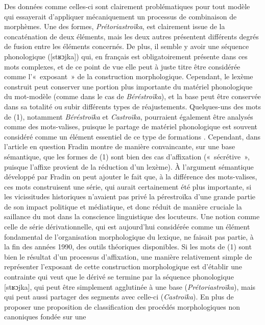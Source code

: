 \documentclass[output=paper]{langsci/langscibook}
\begin{document}
\largerpage[2]
Des données comme celles-ci sont clairement problématiques pour tout
modèle qui essayerait d'appliquer mécaniquement un processus de
combinaison de morphèmes. Une des formes, \emph{Prétoriastroïka}, est
clairement issue de la concaténation de deux éléments, mais les deux
autres présentent différents degrés de fusion entre les éléments
concernés. De plus, il semble y avoir une séquence phonologique
({[}stʁɔjka{]}) qui, en français est obligatoirement présente dans ces
mots complexes, et de ce point de vue elle peut à juste titre être
considérée comme l'{«~exposant~»} de la construction morphologique.
Cependant, le lexème construit peut conserver une portion plus
importante du matériel phonologique du mot-modèle (comme dans le cas de
\emph{Béréstroïka}), et la base peut être conservée dans sa totalité ou
subir différents types de réajustements. Quelques-uns des mots de (1),
notamment \emph{Béréstroïka} et \emph{Castroïka}, pourraient également
être analysés comme des mots-valises, puisque le partage de matériel
phonologique est souvent considéré comme un élément essentiel de ce type
de formations %
\citep[28-31]{Fradin2000}%
%
. Cependant, dans l'article en
question Fradin montre de manière convaincante, sur une base sémantique,
que les formes de (1) sont bien des cas d'affixation («~sécrétive~»,
puisque l'affixe provient de la réduction d'un lexème). À l'argument
sémantique développé par Fradin on peut ajouter le fait que, à la
différence des mots-valises, ces mots construisent une série, qui aurait
certainement été plus importante, si les vicissitudes historiques
n'avaient pas privé la pérestroïka d'une grande partie de son impact
politique et médiatique, et donc réduit de manière cruciale la saillance
du mot dans la conscience linguistique des locuteurs. Une notion comme
celle de série dérivationnelle, qui est aujourd'hui considérée comme un
élément fondamental de l'organisation morphologique du lexique, ne
faisait pas partie, à la fin des années 1990, des outils théoriques
disponibles. Si les mots de (1) sont bien le résultat d'un processus
d'affixation, une manière relativement simple de représenter l'exposant
de cette construction morphologique est d'établir une contrainte qui
veut que le dérivé se termine par la séquence phonologique
{[}stʁɔjka{]}, qui peut être simplement agglutinée à une base
(\emph{Prétoriastroïka}), mais qui peut aussi partager des segments avec
celle-ci (\emph{Castroïka}). En plus de proposer une proposition de
classification des procédés morphologiques non canoniques fondée sur une
\end{document}
